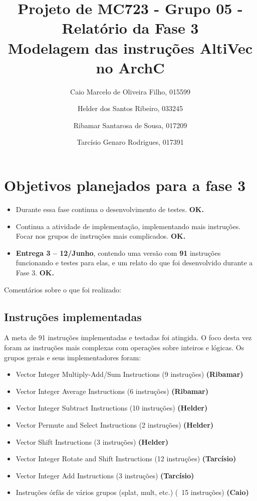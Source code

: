 \documentclass[twocolumn]{article}
\newcommand{\who}[1]{\textbf{ (#1)}}
\begin{document}
\title{Projeto de MC723 - Grupo 05 - Relatório da Fase 3\\ Modelagem das instruções AltiVec no ArchC}
\author{
Caio Marcelo de Oliveira Filho, 015599 \and
Helder dos Santos Ribeiro, 033245 \and
Ribamar Santarosa de Sousa, 017209 \and 
Tarcísio Genaro Rodrigues, 017391
}

\date{}
\maketitle

\section{Objetivos planejados para a fase 3}

\begin{itemize}
\item Durante essa fase continua o desenvolvimento de testes. \textbf{OK.}

\item Continua a atividade de implementação, implementando mais instruções.
Focar nos grupos de instruções mais complicados. \textbf{OK.}

\item \textbf{Entrega 3 -- 12/Junho}, contendo uma versão com \textbf{91}
instruções funcionando e testes para elas, e um relato do que foi desenvolvido
durante a Fase 3. \textbf{OK.}

\end{itemize}

Comentários sobre o que foi realizado:


\subsection{Instruções implementadas}

A meta de 91 instruções implementadas e testadas foi atingida. O foco desta vez
foram as instruções mais complexas com operações sobre inteiros e lógicas. Os
grupos gerais e seus implementadores foram:

\begin{itemize}
\item Vector Integer Multiply-Add/Sum Instructions (9 instruções) \who{Ribamar}
\item Vector Integer Average Instructions (6 instruções) \who{Ribamar}
\item Vector Integer Subtract Instructions (10 instruções) \who{Helder}
\item Vector Permute and Select Instructions (2 instruções) \who{Helder}
\item Vector Shift Instructions (3 instruções) \who{Helder}
\item Vector Integer Rotate and Shift Instructions (12 instruções) \who{Tarcísio}
\item Vector Integer Add Instructions (3 instruções) \who{Tarcísio}
\item Instruções órfãs de vários grupos (splat, mult, etc.) (~15 instruções) \who{Caio}

\end{itemize}
\end{document}
